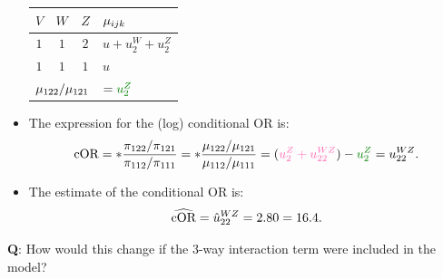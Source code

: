 \documentclass{article}\usepackage[]{graphicx}\usepackage[svgnames]{xcolor}
\let\exp\relax%
\let\log\relax%
\newcommand{\cOR}{\text{cOR}}%
\begin{document}
\begin{itemize}
          \begin{table}[H]
              \centering
              \begin{tabular}{cccl}
                  $ V $                                           & $ W $                       & $ Z $ & $ \log{\mu_{ijk}} $ \\
                  \midrule
                  $1$                                             & $1$                         & $2$   & $ u+u_2^W+u_2^Z $   \\
                  $1$                                             & $1$                         & $1$   & $ u $               \\
                  \midrule
                  \multicolumn{3}{c}{$\log{\mu_{122}/\mu_{121}}$} & $=\textcolor{Green}{u_2^Z}$
              \end{tabular}
          \end{table}
    \item The expression for the (log) conditional OR is:
          \[ \log{\cOR}=\log*{\frac{\pi_{122}/\pi_{121}}{\pi_{112}/\pi_{111}}}=\log*{\frac{\mu_{122}/\mu_{121}}{\mu_{112}/\mu_{111}}}=(\textcolor{HotPink}{u_2^Z+u_{22}^{WZ}})-\textcolor{Green}{u_2^Z}=u_{22}^{WZ}. \]
    \item The estimate of the conditional OR is:
          \[ \widehat{\cOR}=\exp{\hat{u}_{22}^{WZ}}=\exp{2.80}=16.4. \]
\end{itemize}
\begin{Example}{}
    \textbf{Q}: How would this change if the 3-way interaction term were included in the model?
\end{Example}
\end{document}
